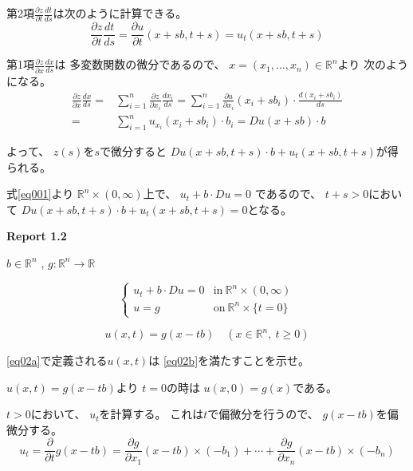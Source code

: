 \documentclass[12pt,b5paper]{ltjsarticle}
\begin{document}
第2項$\frac{\partial z}{\partial t}\frac{d t}{d s}$は次のように計算できる。
\begin{equation}
 \frac{\partial z}{\partial t}\frac{d t}{d s}
  = \frac{\partial u}{\partial t}(x+sb,t+s)
  = u_{t}(x+sb,t+s)
\end{equation}

第1項$\frac{\partial z}{\partial x}\frac{d x}{d s}$は
多変数関数の微分であるので、
$x=(x_1,\dots,x_n)\in\mathbb{R}^n$より
次のようになる。
\begin{align}
 \frac{\partial z}{\partial x}\frac{d x}{d s}
  =& \sum_{i=1}^{n}\frac{\partial z}{\partial x_i}\frac{d x_i}{d s}
  = \sum_{i=1}^{n}\frac{\partial u}{\partial x_i}(x_i+sb_i)\cdot\frac{d (x_i+sb_i)}{d s}\\
  =& \sum_{i=1}^{n} u_{x_i}(x_{i}+sb_{i})\cdot b_{i}
  = Du(x+sb)\cdot b
\end{align}

よって、
$z(s)$を$s$で微分すると
$Du(x+sb, t+s)\cdot b + u_{t}(x+sb,t+s)$が得られる。

式\eqref{eq001}より
$\mathbb{R}^{n} \times (0,\infty)$上で、
$u_{t} + b \cdot Du = 0$
であるので、
$t+s>0$において
$Du(x+sb, t+s)\cdot b + u_{t}(x+sb,t+s)=0$となる。


\hrulefill

\textbf{Report 1.2}

$b\in\mathbb{R}^{n}$
,\quad
$g:\mathbb{R}^{n}\to\mathbb{R}$



\begin{equation}
 \begin{cases}
  u_{t} + b\cdot Du = 0 & \text{in} \ \mathbb{R}^{n}\times (0,\infty)\\
  u=g & \text{on} \ \mathbb{R}^{n}\times \{ t=0 \}
 \end{cases}
 \label{eq02b}
\end{equation}

\begin{equation}
 u(x,t) = g(x-tb) \quad (x\in\mathbb{R}^{n},\ t\geq 0)
 \label{eq02a}
\end{equation}

\eqref{eq02a}で定義される$u(x,t)$は
\eqref{eq02b}を満たすことを示せ。

\dotfill

$u(x,t) = g(x-tb)$より
$t=0$の時は
$u(x,0) = g(x)$である。

$t>0$において、
$u_{t}$を計算する。
これは$t$で偏微分を行うので、
$g(x-tb)$を偏微分する。
\begin{equation}
 u_{t}
  = \frac{\partial}{\partial t}g(x-tb)
  = \frac{\partial g}{\partial x_{1}}(x-tb)\times (-b_{1})+\cdots+\frac{\partial g}{\partial x_{n}}(x-tb)\times (-b_{n})
\end{equation}
\end{document}
